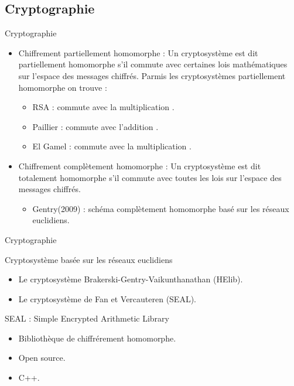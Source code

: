 \documentclass{beamer}
\begin{document}
  \subsection{Cryptographie}
  \begin{frame}{Cryptographie}
    \begin{itemize}
    \item{Chiffrement partiellement homomorphe :\newline
       Un cryptosystème est dit partiellement homomorphe s’il commute avec certaines lois mathématiques sur l’espace des messages chiffrés.
       Parmis les cryptosystèmes partiellement homomorphe on trouve :\newline
       \begin{itemize}
       \item{RSA : commute avec la multiplication .}
       \item{Paillier : commute avec l'addition .}
       \item{El Gamel : commute avec la multiplication .}
   \end{itemize}
      }
      \item{Chiffrement complètement homomorphe :\newline
      Un cryptosystème est dit totalement homomorphe s’il commute avec toutes les lois sur l’espace des messages chiffrés.
      \begin{itemize}
      	\item{Gentry(2009) : schéma complètement homomorphe basé sur les réseaux euclidiens.}
      \end{itemize}
      }
  \end{itemize}
\end{frame}
\begin{frame}{Cryptographie}
\begin{block}{Cryptosystème basée sur les réseaux euclidiens }
  \begin{itemize}
    \item{Le cryptosystème Brakerski-Gentry-Vaikunthanathan (HElib).}
    \item{Le cryptosystème de Fan et Vercauteren (SEAL).}
  \end{itemize}
  \end{block}
\begin{block}{SEAL : Simple Encrypted Arithmetic Library }
  \begin{itemize}
    \item{Bibliothèque de chiffrérement homomorphe.}
    \item{Open source.}
    \item{C++.}
  \end{itemize}
  \end{block}

\end{frame}
\end{document}
